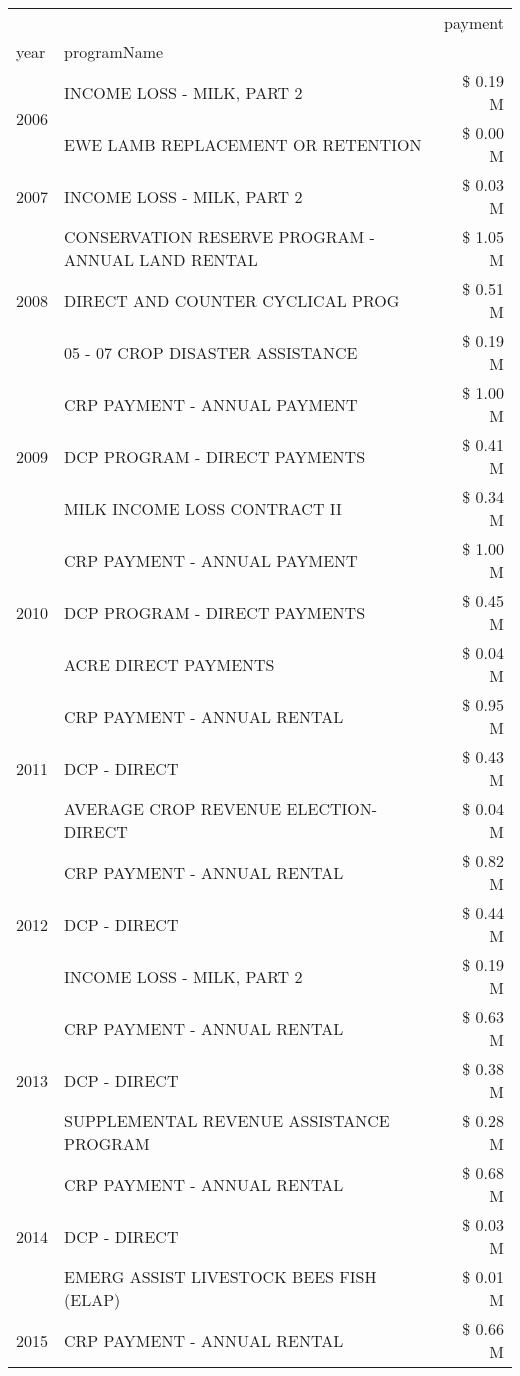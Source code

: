 \begin{tabular}{llr}
\toprule
 &  & payment \\
year & programName &  \\
\midrule
\multirow[t]{2}{*}{2006} & INCOME LOSS - MILK, PART 2 & \$ 0.19 M \\
 & EWE LAMB REPLACEMENT OR RETENTION & \$ 0.00 M \\
\cline{1-3}
2007 & INCOME LOSS - MILK, PART 2 & \$ 0.03 M \\
\cline{1-3}
\multirow[t]{3}{*}{2008} & CONSERVATION RESERVE PROGRAM - ANNUAL LAND RENTAL & \$ 1.05 M \\
 & DIRECT AND COUNTER CYCLICAL PROG & \$ 0.51 M \\
 & 05 - 07 CROP DISASTER ASSISTANCE & \$ 0.19 M \\
\cline{1-3}
\multirow[t]{3}{*}{2009} & CRP PAYMENT - ANNUAL PAYMENT & \$ 1.00 M \\
 & DCP PROGRAM - DIRECT PAYMENTS & \$ 0.41 M \\
 & MILK INCOME LOSS CONTRACT II & \$ 0.34 M \\
\cline{1-3}
\multirow[t]{3}{*}{2010} & CRP PAYMENT - ANNUAL PAYMENT & \$ 1.00 M \\
 & DCP PROGRAM - DIRECT PAYMENTS & \$ 0.45 M \\
 & ACRE DIRECT PAYMENTS & \$ 0.04 M \\
\cline{1-3}
\multirow[t]{3}{*}{2011} & CRP PAYMENT - ANNUAL RENTAL & \$ 0.95 M \\
 & DCP - DIRECT & \$ 0.43 M \\
 & AVERAGE CROP REVENUE ELECTION-DIRECT & \$ 0.04 M \\
\cline{1-3}
\multirow[t]{3}{*}{2012} & CRP PAYMENT - ANNUAL RENTAL & \$ 0.82 M \\
 & DCP - DIRECT & \$ 0.44 M \\
 & INCOME LOSS - MILK, PART 2 & \$ 0.19 M \\
\cline{1-3}
\multirow[t]{3}{*}{2013} & CRP PAYMENT - ANNUAL RENTAL & \$ 0.63 M \\
 & DCP - DIRECT & \$ 0.38 M \\
 & SUPPLEMENTAL REVENUE ASSISTANCE PROGRAM & \$ 0.28 M \\
\cline{1-3}
\multirow[t]{3}{*}{2014} & CRP PAYMENT - ANNUAL RENTAL & \$ 0.68 M \\
 & DCP - DIRECT & \$ 0.03 M \\
 & EMERG ASSIST LIVESTOCK BEES FISH (ELAP) & \$ 0.01 M \\
\cline{1-3}
\multirow[t]{3}{*}{2015} & CRP PAYMENT - ANNUAL RENTAL & \$ 0.66 M \\

\end{tabular}

